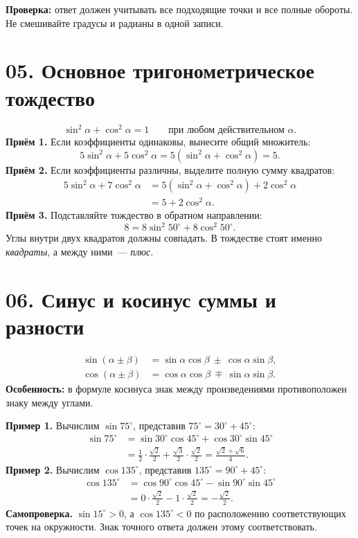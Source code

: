 \documentclass[a4paper,12pt]{article}
\newcommand{\key}[1]{\textcolor{darkaccent}{\textbf{#1}}}
\newcommand{\dd}{^{\circ}}
\begin{document}
\key{Проверка:} ответ должен учитывать все подходящие точки и все полные обороты. Не смешивайте градусы и радианы в одной записи.

\clearpage
\section*{05. Основное тригонометрическое тождество}
\[
\boxed{\sin^2\alpha+\cos^2\alpha=1}\qquad \text{при любом действительном }\alpha.
\]
\key{Приём 1.} Если коэффициенты одинаковы, вынесите общий множитель:
\[
5\sin^2\alpha+5\cos^2\alpha
=5(\sin^2\alpha+\cos^2\alpha)=\boxed{5}.
\]
\key{Приём 2.} Если коэффициенты различны, выделите полную сумму квадратов:
\begin{align*}
5\sin^2\alpha+7\cos^2\alpha
&=5(\sin^2\alpha+\cos^2\alpha)+2\cos^2\alpha\\
&=\boxed{5+2\cos^2\alpha}.
\end{align*}
\key{Приём 3.} Подставляйте тождество в обратном направлении:
\[
\boxed{8=8\sin^2 50\dd+8\cos^2 50\dd}.
\]
Углы внутри двух квадратов должны совпадать. В тождестве стоят именно \emph{квадраты}, а между ними~--- \emph{плюс}.

\section*{06. Синус и косинус суммы и разности}
\begin{align*}
\sin(\alpha\pm\beta)&=\sin\alpha\cos\beta\ \pm\ \cos\alpha\sin\beta,\\
\cos(\alpha\pm\beta)&=\cos\alpha\cos\beta\ \mp\ \sin\alpha\sin\beta.
\end{align*}
\key{Особенность:} в формуле косинуса знак между произведениями противоположен знаку между углами.

\key{Пример 1.} Вычислим $\sin75\dd$, представив $75\dd=30\dd+45\dd$:
\begin{align*}
\sin75\dd
 &=\sin30\dd\cos45\dd+\cos30\dd\sin45\dd\\
 &=\frac12\cdot\frac{\sqrt2}{2}+\frac{\sqrt3}{2}\cdot\frac{\sqrt2}{2}
 =\boxed{\frac{\sqrt2+\sqrt6}{4}}.
\end{align*}
\key{Пример 2.} Вычислим $\cos135\dd$, представив $135\dd=90\dd+45\dd$:
\begin{align*}
\cos135\dd
 &=\cos90\dd\cos45\dd-\sin90\dd\sin45\dd\\
 &=0\cdot\frac{\sqrt2}{2}-1\cdot\frac{\sqrt2}{2}
 =\boxed{-\frac{\sqrt2}{2}}.
\end{align*}
\key{Самопроверка.} $\sin15\dd>0$, а $\cos135\dd<0$ по расположению соответствующих точек на окружности. Знак точного ответа должен этому соответствовать.
\end{document}
